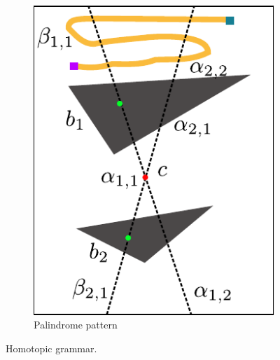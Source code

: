 \documentclass[letterpaper, 10 pt, conference]{ieeeconf}
\begin{document}
\begin{figure}
\begin{subfigure}[t]{0.4\linewidth}
		\includegraphics[width=\textwidth]{fig/repeated_pattern}
		\caption{Palindrome pattern}
		\label{fig:grammar:palindrome_pattern}
	\end{subfigure} 
	\caption{Homotopic grammar.}
	\label{fig:grammar}
\end{figure}
\end{document}
